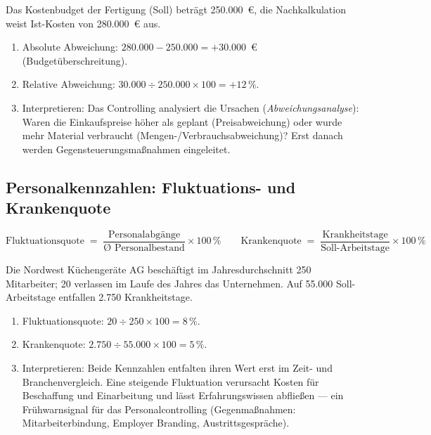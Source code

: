 \documentclass[11pt, a4paper]{article}
\begin{document}
\begin{beispiel}
Das Kostenbudget der Fertigung (Soll) beträgt 250.000~€, die Nachkalkulation weist
Ist-Kosten von 280.000~€ aus.
\begin{enumerate}
  \item Absolute Abweichung: $280.000 - 250.000 = +30.000$~€ (Budgetüberschreitung).
  \item Relative Abweichung: $30.000 \div 250.000 \times 100 = +12\,\%$.
  \item Interpretieren: Das Controlling analysiert die Ursachen
    (\emph{Abweichungsanalyse}): Waren die Einkaufspreise höher als geplant
    (Preisabweichung) oder wurde mehr Material verbraucht (Mengen-/Verbrauchsabweichung)?
    Erst danach werden Gegensteuerungsmaßnahmen eingeleitet.
\end{enumerate}
\end{beispiel}

\subsection{Personalkennzahlen: Fluktuations- und Krankenquote}

\begin{merksatz}[title={\bfseries Formeln: Fluktuationsquote und Krankenquote}]
\[
\text{Fluktuationsquote} \;=\; \frac{\text{Personalabgänge}}{\text{Ø Personalbestand}} \times 100\,\%
\qquad
\text{Krankenquote} \;=\; \frac{\text{Krankheitstage}}{\text{Soll-Arbeitstage}} \times 100\,\%
\]
\end{merksatz}

\begin{beispiel}
Die Nordwest Küchengeräte AG beschäftigt im Jahresdurchschnitt 250 Mitarbeiter;
20 verlassen im Laufe des Jahres das Unternehmen. Auf 55.000 Soll-Arbeitstage entfallen
2.750 Krankheitstage.
\begin{enumerate}
  \item Fluktuationsquote: $20 \div 250 \times 100 = 8\,\%$.
  \item Krankenquote: $2.750 \div 55.000 \times 100 = 5\,\%$.
  \item Interpretieren: Beide Kennzahlen entfalten ihren Wert erst im Zeit- und
    Branchenvergleich. Eine steigende Fluktuation verursacht Kosten für Beschaffung und
    Einarbeitung und lässt Erfahrungswissen abfließen --- ein Frühwarnsignal für das
    Personalcontrolling (Gegenmaßnahmen: Mitarbeiterbindung, Employer Branding,
    Austrittsgespräche).
\end{enumerate}
\end{beispiel}
\end{document}
